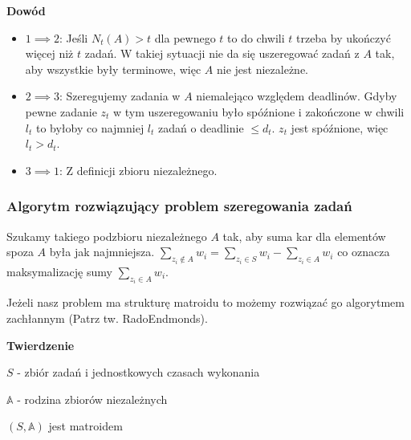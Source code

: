 \textbf{Dowód}
\begin{itemize}
	\item{ $1 \implies 2$: 
	Jeśli $N_t(A) > t$ dla pewnego $t$ to do chwili $t$ trzeba by ukończyć więcej niż $t$ zadań. W takiej sytuacji nie da się uszeregować zadań z $A$ tak, aby wszystkie były terminowe, więc $A$ nie jest niezależne.}
	\item{ $2 \implies 3$: 
	Szeregujemy zadania w $A$ niemalejąco względem deadlinów. Gdyby pewne zadanie $z_t$ w tym uszeregowaniu było spóźnione i zakończone w chwili $l_t$ to byłoby co najmniej $l_t$ zadań o deadlinie $\leq d_t$. $z_t$ jest spóźnione, więc $l_t > d_t$.}
	\item{ $3 \implies 1$: Z definicji zbioru niezależnego.}
\end{itemize}

\subsubsection{Algorytm rozwiązujący problem szeregowania zadań}
Szukamy takiego podzbioru niezależnego $A$ tak, aby suma kar dla elementów spoza $A$ była jak najmniejsza. $\sum_{z_i \not\in A} w_i = \sum_{z_i \in S} w_i - \sum_{z_i \in A} w_i$ co oznacza maksymalizację sumy $\sum_{z_i \in A} w_i$. 

Jeżeli nasz problem ma strukturę matroidu to możemy rozwiązać go algorytmem zachłannym (Patrz tw. RadoEndmonds).

\textbf{Twierdzenie} 

$S$ - zbiór zadań i jednostkowych czasach wykonania 

$\mathbb{A}$ - rodzina zbiorów niezależnych 

$(S,\mathbb{A})$ jest matroidem 


